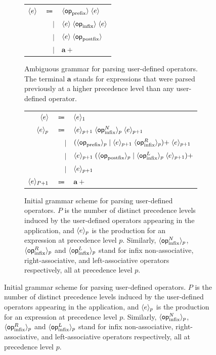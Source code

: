 {\newcommand{\prefix}{\mathsf{op}_{\text{prefix}}}
\newcommand{\infix}{\mathsf{op}_{\text{infix}}}
\newcommand{\infixl}{\mathsf{op}_{\text{infix}}^L}
\newcommand{\infixr}{\mathsf{op}_{\text{infix}}^R}
\newcommand{\infixn}{\mathsf{op}_{\text{infix}}^N}
\newcommand{\postfix}{\mathsf{op}_{\text{postfix}}}
\begin{figure}[!htb]
\begin{subfigure}{\linewidth}
\centering
\begin{tabular}{rrl}
$ \langle e\rangle $ & $ \Coloneqq $ & $ \angled{\prefix} \; \angled{e} $\\
& $ \mid $ & $ \angled{e} \; \angled{\infix} \; \angled{e} $\\
& $ \mid $ & $ \angled{e} \; \angled{\postfix} $\\
& $ \mid $ & $ \mathbf{a}+ $
\end{tabular}
\caption{Ambiguous grammar for parsing user-defined operators. The terminal $ \mathbf{a} $ stands for expressions that were parsed previously at a higher precedence level than any user-defined operator.}
\label{figure:user-defined-operators-initial-grammar}
\end{subfigure}
\par\bigskip
\begin{subfigure}{\linewidth}
\centering
\begin{tabular}{rrl}
$ \langle e\rangle $ & $ \Coloneqq $ & $ \langle e\rangle_1 $\\
$ \langle e\rangle_p $ & $ \Coloneqq $ & $ \angled{e}_{p + 1} \; \angled{\infixn}_p \; \angled{e}_{p + 1} $\\
& $ \mid $ & $ (\angled{\prefix}_p \mid \angled{e}_{p + 1} \; \angled{\infixr}_p){+} \; \angled{e}_{p + 1} $\\
& $ \mid $ & $ \angled{e}_{p + 1} \; (\angled{\postfix}_p \mid \angled{\infixl}_p \; \angled{e}_{p + 1}){+} $\\
& $ \mid $ & $ \langle e\rangle_{p + 1} $\\
$ \langle e\rangle_{P + 1} $ & $ \Coloneqq $ & $ \mathbf{a}+ $
\end{tabular}
\caption{%
Initial grammar scheme for parsing user-defined operators.
$ P $ is the number of distinct precedence levels induced by the user-defined operators appearing in the application, and $ \langle e\rangle_p $ is the production for an expression at precedence level $ p $.
Similarly, $ \angled{\infixn}_p $, $ \angled{\infixr}_p $ and $ \angled{\infixl}_p $ stand for infix non-associative, right-associative, and left-associative operators respectively, all at precedence level $ p $.
}
\end{subfigure}
\end{figure}}
